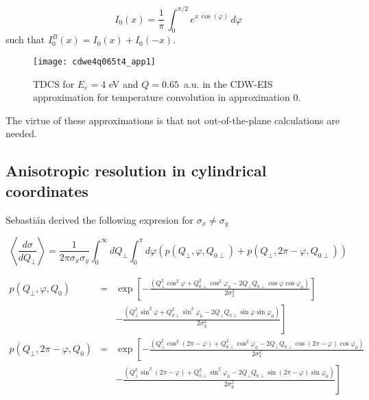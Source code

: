 \begin{equation}\label{Q:I0}
  I_{0}(x)= \frac{1}{\pi} \, \int_{0}^{\pi/2} e^{x \, \cos(\varphi)} \, d \varphi
\end{equation}
%
such that $I^{B}_{0}(x) = I_{0}(x) + I_{0}(-x)$.


\begin{figure}[!htpb]
  \centering
\texttt{[image: cdwe4q065t4\_app1]}
  \caption{TDCS for $E_{e}=4$ eV and $Q=0.65$~a.u. in the CDW-EIS approximation for temperature convolution in approximation 0.}
  \label{F:cdwe4q065t4_app1}
\end{figure}

The virtue of these approximations is that not out-of-the-plane calculations are needed.


\subsection{Anisotropic resolution in cylindrical coordinates}
\label{S:anis-resol-cylin-coord}

Sebasti\'{a}n derived the following expresion for $\sigma_{x}\neq \sigma_{y}$

\[
\left\langle \frac{d \sigma }{dQ_{\perp}} \right\rangle = \frac{1}{2\pi
  \sigma_{x} \sigma_{y}} \int_{0}^{\infty} dQ_{\perp} \int_{0}^{\pi} d\varphi
\left(p (Q_{\perp },\varphi ,Q_{0\perp}) + p(Q_{\perp },2\pi -\varphi
  ,Q_{0\perp}) \right)
\]

\begin{eqnarray*}
  p(Q_{\perp },\varphi ,Q_{0}) &=&\exp \left[ -\frac{(Q_{\perp }^{2}\cos
      ^{2}\varphi +Q_{0\perp }^{2}\cos ^{2}\varphi _{0}-2Q_{\perp }Q_{0\perp }\cos
      \varphi \cos \varphi _{0})}{2\sigma _{x}^{2}} \right] 
  \\
  && \left.  - \frac{(Q_{\perp }^{2} \sin^{2}\varphi +Q_{0\perp }^{2}\sin ^{2}\varphi _{0}-2Q_{\perp }Q_{0\perp }\sin
      \varphi \sin \varphi _{0})}{2\sigma _{y}^{2}}\right]  \\
  p(Q_{\perp },2\pi -\varphi ,Q_{0}) 
  &=&\exp \left[ - \frac{(Q_{\perp }^{2}\cos^{2} \left( 2\pi -\varphi \right) +Q_{0\perp }^{2} \cos ^{2}\varphi_{0} - 
      2Q_{\perp }Q_{0\perp }\cos \left( 2\pi -\varphi \right) \cos \varphi_{0})} {2\sigma_{x}^{2}} \right.  \\
  && \left. - \frac{(Q_{\perp }^{2}\sin ^{2}\left( 2\pi -\varphi \right) + Q_{0\perp }^{2}\sin ^{2}\varphi _{0}-2Q_{\perp }Q_{0\perp } 
      \sin\left( 2\pi -\varphi \right) \sin \varphi _{0})}{2\sigma _{y}^{2}}\right] 
\end{eqnarray*}

